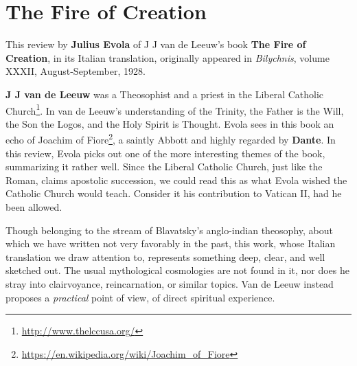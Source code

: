 \section{The Fire of Creation}

\begin{quotex}
This review by \textbf{Julius Evola} of J J van de Leeuw's book \textbf{The Fire of Creation}, in its Italian translation, originally appeared in \emph{Bilychnis}, volume XXXII, August-September, 1928.

\textbf{J J van de Leeuw} was a Theosophist and a priest in the Liberal Catholic Church\footnote{\url{http://www.thelccusa.org/}}. In van de Leeuw's understanding of the Trinity, the Father is the Will, the Son the Logos, and the Holy Spirit is Thought. Evola sees in this book an echo of Joachim of Fiore\footnote{\url{https://en.wikipedia.org/wiki/Joachim_of_Fiore}}, a saintly Abbott and highly regarded by \textbf{Dante}. In this review, Evola picks out one of the more interesting themes of the book, summarizing it rather well. Since the Liberal Catholic Church, just like the Roman, claims apostolic succession, we could read this as what Evola wished the Catholic Church would teach. Consider it his contribution to Vatican II, had he been allowed.
\end{quotex}


Though belonging to the stream of Blavatsky's anglo-indian theosophy, about which we have written not very favorably in the past, this work, whose Italian translation we draw attention to, represents something deep, clear, and well sketched out. The usual mythological cosmologies are not found in it, nor does he stray into clairvoyance, reincarnation, or similar topics. Van de Leeuw instead proposes a \emph{practical} point of view, of direct spiritual experience.

